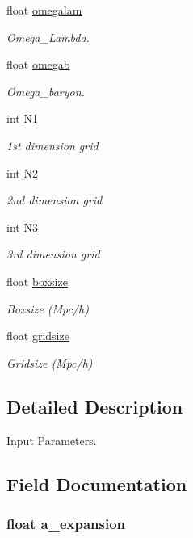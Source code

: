 \begin{DoxyCompactItemize}
float \hyperlink{structparams_ac99cfe381d57df39c2cdb6d5c8f6f548}{omegalam}
\begin{DoxyCompactList}\small\item\em Omega\+\_\+\+Lambda. \end{DoxyCompactList}\item 
float \hyperlink{structparams_aeaccd726adbb20f37e40458f9fc1789c}{omegab}
\begin{DoxyCompactList}\small\item\em Omega\+\_\+baryon. \end{DoxyCompactList}\item 
int \hyperlink{structparams_a5a6a26e0827f9640d2eb7201017f19d7}{N1}
\begin{DoxyCompactList}\small\item\em 1st dimension grid \end{DoxyCompactList}\item 
int \hyperlink{structparams_adeea8075a0038c985c63d45161804d60}{N2}
\begin{DoxyCompactList}\small\item\em 2nd dimension grid \end{DoxyCompactList}\item 
int \hyperlink{structparams_a4e8e9c2bf9e06ae07ef364c05a073302}{N3}
\begin{DoxyCompactList}\small\item\em 3rd dimension grid \end{DoxyCompactList}\item 
float \hyperlink{structparams_aec8643d101b2d4269bd09101195acde9}{boxsize}
\begin{DoxyCompactList}\small\item\em Boxsize (Mpc/h) \end{DoxyCompactList}\item 
float \hyperlink{structparams_a6d64c764749c83c38277585af5854d89}{gridsize}
\begin{DoxyCompactList}\small\item\em Gridsize (Mpc/h) \end{DoxyCompactList}\end{DoxyCompactItemize}


\subsection{Detailed Description}
Input Parameters. 

\subsection{Field Documentation}
\hypertarget{structparams_ab8ae1614d88a1fdcded37c8573053e9c}{
\subsubsection[{a\+\_\+expansion}]{\setlength{\rightskip}{0pt plus 5cm}float a\+\_\+expansion}}\label{structparams_ab8ae1614d88a1fdcded37c8573053e9c}


